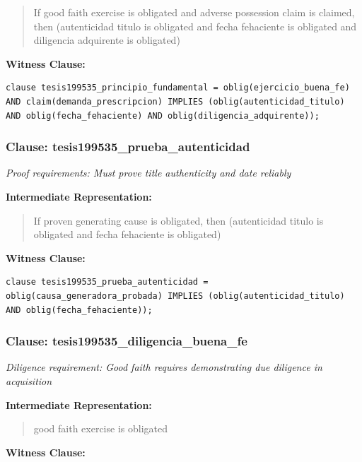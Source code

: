 \documentclass[11pt,a4paper]{article}
\begin{document}
\begin{quote}
If good faith exercise is obligated and adverse possession claim is claimed, then (autenticidad titulo is obligated and fecha fehaciente is obligated and diligencia adquirente is obligated)
\end{quote}

\textbf{Witness Clause:}

\begin{lstlisting}[style=witnessstyle, language=Witness]
clause tesis199535_principio_fundamental = oblig(ejercicio_buena_fe) AND claim(demanda_prescripcion) IMPLIES (oblig(autenticidad_titulo) AND oblig(fecha_fehaciente) AND oblig(diligencia_adquirente));
\end{lstlisting}

\subsubsection{Clause: tesis199535\_prueba\_autenticidad}

\textit{Proof requirements: Must prove title authenticity and date reliably}

\textbf{Intermediate Representation:}

\begin{quote}
If proven generating cause is obligated, then (autenticidad titulo is obligated and fecha fehaciente is obligated)
\end{quote}

\textbf{Witness Clause:}

\begin{lstlisting}[style=witnessstyle, language=Witness]
clause tesis199535_prueba_autenticidad = oblig(causa_generadora_probada) IMPLIES (oblig(autenticidad_titulo) AND oblig(fecha_fehaciente));
\end{lstlisting}

\subsubsection{Clause: tesis199535\_diligencia\_buena\_fe}

\textit{Diligence requirement: Good faith requires demonstrating due diligence in acquisition}

\textbf{Intermediate Representation:}

\begin{quote}
good faith exercise is obligated
\end{quote}

\textbf{Witness Clause:}
\end{document}
